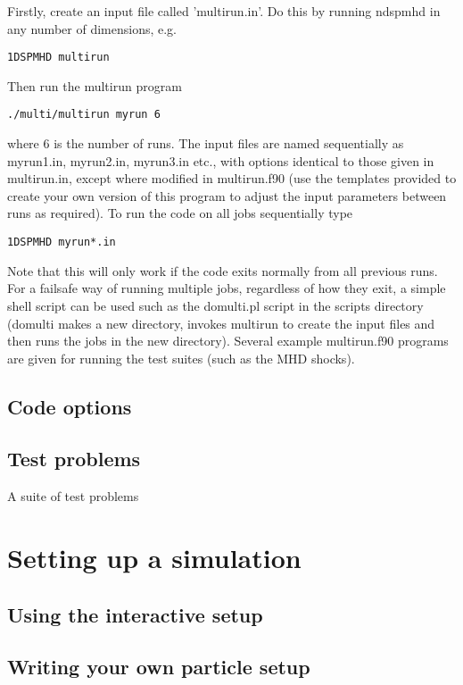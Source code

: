 \documentclass[a4paper,12pt]{article}
\begin{document}
Firstly, create an input file called 'multirun.in'. Do this by running ndspmhd
in any number of dimensions, e.g.
\begin{verbatim}
1DSPMHD multirun
\end{verbatim}
Then run the multirun program
\begin{verbatim}
./multi/multirun myrun 6
\end{verbatim}
where 6 is the number of runs. The input files are named sequentially as
myrun1.in, myrun2.in, myrun3.in etc., with options identical to those given in
multirun.in, except where modified in multirun.f90 (use the templates provided
to create your own version of this program to adjust the input parameters
between runs as required). To run the code on all jobs sequentially
type
\begin{verbatim}
1DSPMHD myrun*.in
\end{verbatim}
Note that this will only work if the code exits normally from all previous runs.
For a failsafe way of running multiple jobs, regardless of how they exit,  a
simple shell script can be used such as the domulti.pl script in the scripts
directory (domulti makes a new directory, invokes multirun to create the input
files and then runs the jobs in the new directory). Several example multirun.f90
programs are given for running the test suites (such as the MHD shocks).

\subsection{Code options}

\subsection{Test problems}
 A suite of test problems

\section{Setting up a simulation}

\subsection{Using the interactive setup}

\subsection{Writing your own particle setup}
\end{document}
